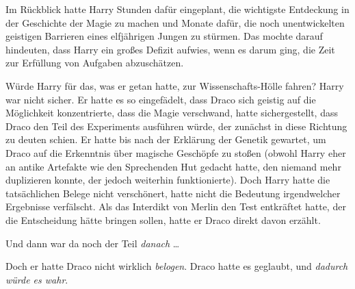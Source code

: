 Im Rückblick hatte Harry Stunden dafür eingeplant, die wichtigste Entdeckung in der Geschichte der Magie zu machen und Monate dafür, die noch unentwickelten geistigen Barrieren eines elfjährigen Jungen zu stürmen. Das mochte darauf hindeuten, dass Harry ein großes Defizit aufwies, wenn es darum ging, die Zeit zur Erfüllung von Aufgaben abzuschätzen.

Würde Harry für das, was er getan hatte, zur Wissenschafts-Hölle fahren? Harry war nicht sicher. Er hatte es so eingefädelt, dass Draco sich geistig auf die Möglichkeit konzentrierte, dass die Magie verschwand, hatte sichergestellt, dass Draco den Teil des Experiments ausführen würde, der zunächst in diese Richtung zu deuten schien. Er hatte bis nach der Erklärung der Genetik gewartet, um Draco auf die Erkenntnis über magische Geschöpfe zu stoßen (obwohl Harry eher an antike Artefakte wie den Sprechenden Hut gedacht hatte, den niemand mehr duplizieren konnte, der jedoch weiterhin funktionierte). Doch Harry hatte die tatsächlichen Belege nicht verschönert, hatte nicht die Bedeutung irgendwelcher Ergebnisse verfälscht. Als das Interdikt von Merlin den Test entkräftet hatte, der die Entscheidung hätte bringen sollen, hatte er Draco direkt davon erzählt.

Und dann war da noch der Teil \emph{danach} …

Doch er hatte Draco nicht wirklich \emph{belogen}. Draco hatte es geglaubt, und \emph{dadurch würde es wahr}.

